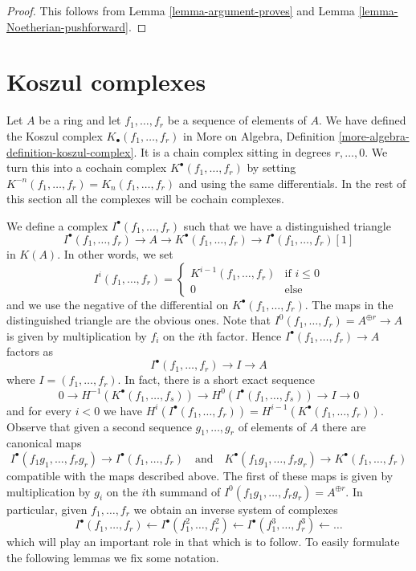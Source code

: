 \documentclass{stacks-project}
\theoremstyle{plain}
\theoremstyle{definition}
\theoremstyle{remark}
\numberwithin{equation}{subsection}
\begin{document}
\begin{proof}
This follows from Lemma \ref{lemma-argument-proves} and
Lemma \ref{lemma-Noetherian-pushforward}.
\end{proof}






\section{Koszul complexes}
\label{section-koszul}

\noindent
Let $A$ be a ring and let $f_1, \ldots, f_r$ be a sequence of elements
of $A$. We have defined the Koszul complex
$K_\bullet(f_1, \ldots, f_r)$ in
More on Algebra, Definition \ref{more-algebra-definition-koszul-complex}.
It is a chain complex sitting in degrees $r, \ldots, 0$.
We turn this into a cochain complex $K^\bullet(f_1, \ldots, f_r)$
by setting $K^{-n}(f_1, \ldots, f_r) = K_n(f_1, \ldots, f_r)$
and using the same differentials. In the rest of this section all
the complexes will be cochain complexes.

\medskip\noindent
We define a complex $I^\bullet(f_1, \ldots, f_r)$
such that we have a distinguished triangle
$$
I^\bullet(f_1, \ldots, f_r) \to
A \to
K^\bullet(f_1, \ldots, f_r) \to
I^\bullet(f_1, \ldots, f_r)[1]
$$
in $K(A)$.
In other words, we set
$$
I^i(f_1, \ldots, f_r) =
\left\{
\begin{matrix}
K^{i - 1}(f_1, \ldots, f_r) & \text{if } i \leq 0 \\
0 & \text{else}
\end{matrix}
\right.
$$
and we use the negative of the differential on $K^\bullet(f_1, \ldots, f_r)$.
The maps in the distinguished triangle are the obvious ones. Note that
$I^0(f_1, \ldots, f_r) = A^{\oplus r} \to A$ is given by
multiplication by $f_i$ on the $i$th factor.
Hence $I^\bullet(f_1, \ldots, f_r) \to A$ factors as
$$
I^\bullet(f_1, \ldots, f_r) \to I \to A
$$
where $I = (f_1, \ldots, f_r)$. In fact, there is a short exact sequence
$$
0 \to H^{-1}(K^\bullet(f_1, \ldots, f_s)) \to
H^0(I^\bullet(f_1, \ldots, f_s)) \to I \to 0
$$
and for every $i < 0$ we have
$H^i(I^\bullet(f_1, \ldots, f_r)) = H^{i - 1}(K^\bullet(f_1, \ldots, f_r))$.
Observe that given a second sequence $g_1, \ldots, g_r$ of elements of $A$
there are canonical maps
$$
I^\bullet(f_1g_1, \ldots, f_rg_r) \to I^\bullet(f_1, \ldots, f_r)
\quad\text{and}\quad
K^\bullet(f_1g_1, \ldots, f_rg_r) \to K^\bullet(f_1, \ldots, f_r)
$$
compatible with the maps described above. The first of these maps is
given by multiplication by $g_i$ on the $i$th summand of
$I^0(f_1g_1, \ldots, f_rg_r) = A^{\oplus r}$. In particular, given
$f_1, \ldots, f_r$ we obtain an inverse system of complexes
\begin{equation}
\label{equation-system}
I^\bullet(f_1, \ldots, f_r) \leftarrow
I^\bullet(f_1^2, \ldots, f_r^2) \leftarrow
I^\bullet(f_1^3, \ldots, f_r^3) \leftarrow \ldots
\end{equation}
which will play an important role in that which is to follow.
To easily formulate the following lemmas we fix some notation.
\end{document}
